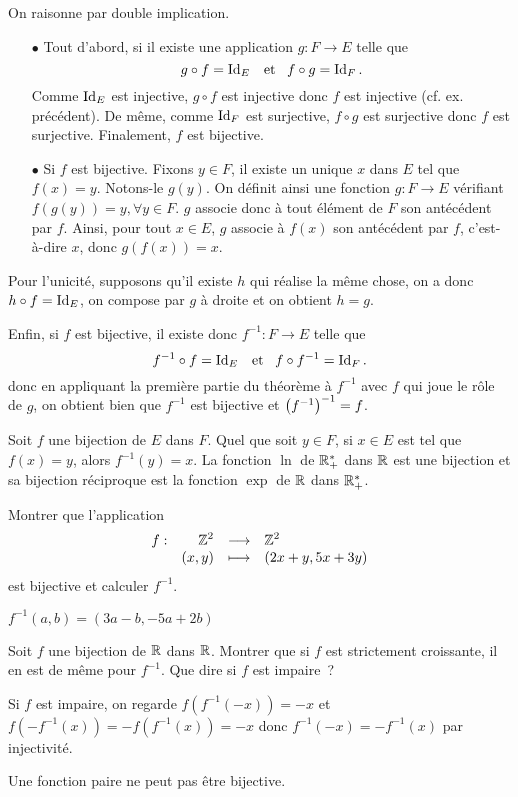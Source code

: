 \documentclass{magnolia}
\begin{document}
\begin{preuve}
On raisonne par double implication. 
\begin{itemize}
\item [$\bullet$]
Tout d'abord, si il existe une application $g:F\to E$ telle que \[g\circ f=\operatorname{Id}_E \quad\!\text{et}\quad\! f\circ g=\operatorname{Id}_F.\]
Comme $\operatorname{Id}_E$ est injective, $g\circ f$ est injective donc $f$ est injective (cf. ex. précédent). De même, comme $\operatorname{Id}_F$ est surjective, $f\circ g $ est surjective donc $f$ est surjective.
Finalement, $f$ est bijective.
\item [$\bullet$] Si $f$ est bijective. Fixons $y\in F$, il existe un unique $x$ dans $E$ tel que $f(x)=y$. Notons-le $g(y)$. On définit ainsi une fonction $g:F\to E$ vérifiant $f(g(y))=y, \forall y \in F$. $g$ associe donc à tout élément de $F$ son antécédent par $f$. Ainsi, pour tout $x\in E$, $g$ associe à $f(x)$ son antécédent par $f$, c'est-à-dire $x$, donc $g(f(x))=x$.
\end{itemize}
Pour l'unicité, supposons qu'il existe $h$ qui réalise la même chose, on a donc $h\circ f=\operatorname{Id}_E$, on compose par $g$ à droite et on obtient $h=g$.

Enfin, si $f$ est bijective, il existe donc $f^{-1} : F\to E$ telle que \[f^{-1}\circ f=\operatorname{Id}_E \quad\!\text{et}\quad\! f\circ f^{-1}=\operatorname{Id}_F.\] donc en appliquant la première partie du théorème à $f^{-1}$ avec $f$ qui joue le rôle de $g$, on obtient bien que $f^{-1}$ est bijective et $\left(f^{-1}\right)^{-1}=f$.

\end{preuve}

\begin{remarques}
\remarque Soit $f$ une bijection de $E$ dans $F$. Quel que soit $y\in F$, si $x\in E$
  est tel que $f(x)=y$, alors $f^{-1}(y)=x$.
\remarque La fonction $\ln$ de $\mathbb{R}_+^*$ dans $\mathbb{R}$ est une bijection et sa
  bijection réciproque est la fonction $\exp$ de $\mathbb{R}$ dans $\mathbb{R}_+^*$.
\end{remarques}

\begin{exos}
\exo Montrer que l'application
  \[\begin{array}[t]{lrcl} \displaystyle{f} : & \displaystyle{\mathbb{Z}^2} & \longrightarrow & \displaystyle{\mathbb{Z}^2} \\ & \displaystyle{(x,y)} & \longmapsto & \displaystyle{(2x+y,5x+3y)} \end{array}\]
  est bijective et calculer $f^{-1}$.
	\begin{sol}
$f^{-1}(a, b)=(3a-b,-5a+2b)$
	\end{sol}
\exo Soit $f$ une bijection de $\mathbb{R}$ dans $\mathbb{R}$. Montrer que si $f$ est
  strictement croissante, il en est de même pour $f^{-1}$. Que dire si $f$
  est impaire~?
  \begin{sol}
  Si $f$ est impaire, on regarde $f(f^{-1}(-x))=-x$ et $f(-f^{-1}(x))=-f(f^{-1}(x))=-x$ donc $f^{-1}(-x)=-f^{-1}(x)$ par injectivité.
  
  Une fonction paire ne peut pas être bijective.
  \end{sol}
\end{exos}
\end{document}
